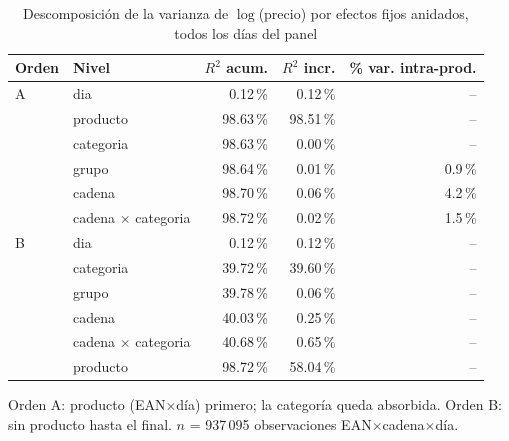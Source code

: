 \begin{table}[htbp]
\caption{Descomposici\'on de la varianza de $\log$(precio) por efectos fijos anidados, todos los d\'ias del panel}
\label{tab:varianza}
\centering\scriptsize\setlength{\tabcolsep}{3pt}
\begin{tabular}{@{}llrrr@{}}
\toprule
Orden & Nivel & $R^2$ acum. & $R^2$ incr. & \% var. intra-prod. \\
\midrule
A & dia & 0.12\,\% & 0.12\,\% & -- \\
 & producto & 98.63\,\% & 98.51\,\% & -- \\
 & categoria & 98.63\,\% & 0.00\,\% & -- \\
 & grupo & 98.64\,\% & 0.01\,\% & 0.9\,\% \\
 & cadena & 98.70\,\% & 0.06\,\% & 4.2\,\% \\
 & cadena $\times$ categoria & 98.72\,\% & 0.02\,\% & 1.5\,\% \\
\midrule
B & dia & 0.12\,\% & 0.12\,\% & -- \\
 & categoria & 39.72\,\% & 39.60\,\% & -- \\
 & grupo & 39.78\,\% & 0.06\,\% & -- \\
 & cadena & 40.03\,\% & 0.25\,\% & -- \\
 & cadena $\times$ categoria & 40.68\,\% & 0.65\,\% & -- \\
 & producto & 98.72\,\% & 58.04\,\% & -- \\
\bottomrule\end{tabular}
\par\smallskip\raggedright\scriptsize Orden A: producto (EAN$\times$d\'ia) primero; la categor\'ia queda absorbida. Orden B: sin producto hasta el final. $n$ = 937\,095 observaciones EAN$\times$cadena$\times$d\'ia.
\end{table}
